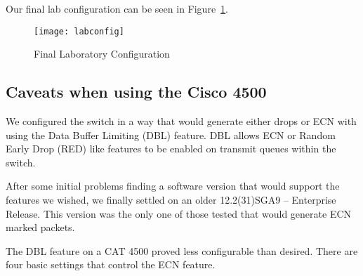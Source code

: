 \documentclass[12pt]{article}
\begin{document}

Our final lab configuration can be seen in Figure~\ref{fig:labconfig}.

\begin{figure}[!h]
\centering
\texttt{[image: labconfig]}
\caption{Final Laboratory Configuration }
\label{fig:labconfig}
\end{figure}



\subsection{Caveats when using the Cisco 4500}

We configured the switch in a way that would generate either drops
or ECN with using the Data Buffer Limiting (DBL) feature. DBL allows ECN or Random Early
Drop (RED) like features to be enabled on transmit queues within the switch.

After some initial problems finding a software version that would
support the features we wished, we finally settled on an older
12.2(31)SGA9 -- Enterprise Release. This version was the only
one of those tested that would generate ECN marked packets.

The DBL feature on a CAT 4500 proved less configurable than desired. There are four
basic settings that control the ECN feature. 
\end{document}
